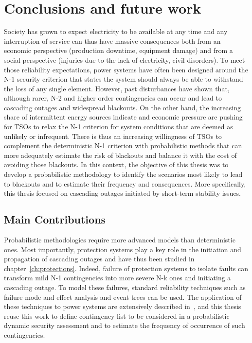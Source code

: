 \chapter{Conclusions and future work}
\label{ch:perspectives}

Society has grown to expect electricity to be available at any time and any interruption of service can thus have massive consequences both from an economic perspective (production downtime, equipment damage) and from a social perspective (injuries due to the lack of electricity, civil disorders). To meet those reliability expectations, power systems have often been designed around the N-1 security criterion that states the system should always be able to withstand the loss of any single element. However, past disturbances have shown that, although rarer, N-2 and higher order contingencies can occur and lead to cascading outages and widespread blackouts. On the other hand, the increasing share of intermittent energy sources indicate and economic pressure are pushing for TSOs to relax the N-1 criterion for system conditions that are deemed as unlikely or infrequent. There is thus an increasing willingness of TSOs to complement the deterministic N-1 criterion with probabilistic methods that can more adequately estimate the risk of blackouts and balance it with the cost of avoiding those blackouts. In this context, the objective of this thesis was to develop a probabilistic methodology to identify the scenarios most likely to lead to blackouts and to estimate their frequency and consequences. More specifically, this thesis focused on cascading outages initiated by short-term stability issues.

\section{Main Contributions}

Probabilistic methodologies require more advanced models than deterministic ones. Most importantly, protection systems play a key role in the initiation and propagation of cascading outages and have thus been studied in chapter~\ref{ch:protections}. Indeed, failure of protection systems to isolate faults can transform mild N-1 contingencies into more severe N-k ones and initiating a cascading outage. To model these failures, standard reliability techniques such as failure mode and effect analysis and event trees can be used. The application of these techniques to power systems are extensively described in~\cite{GridPSA}, and this thesis reuse this work to define contingency list to be considered in a probabilistic dynamic security assessment and to estimate the frequency of occurrence of such contingencies.


